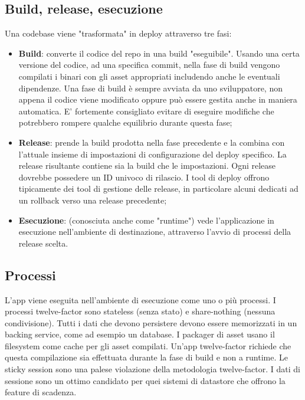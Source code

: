 \documentclass[PianoDiQualifica.tex]{subfiles}
\begin{document}
\subsection{Build, release, esecuzione}
Una codebase viene "trasformata" in deploy attraverso tre fasi:
\begin{itemize}
\item \textbf{Build}: converte il codice del repo in una build "eseguibile". Usando una certa versione del codice, ad una specifica commit, nella fase di build vengono compilati i binari con gli asset appropriati includendo anche le eventuali dipendenze. Una fase di build è sempre avviata da uno sviluppatore, non appena il codice viene modificato oppure può essere gestita anche in maniera automatica. E' fortemente consigliato evitare di eseguire modifiche che potrebbero rompere qualche equilibrio durante questa fase;
\item \textbf{Release}: prende la build prodotta nella fase precedente e la combina con l'attuale insieme di impostazioni di configurazione del deploy specifico. La release risultante contiene sia la build che le impostazioni. Ogni release dovrebbe possedere un ID univoco di rilascio. I tool di deploy offrono tipicamente dei tool di gestione delle release, in particolare alcuni dedicati ad un rollback verso una release precedente;
\item \textbf{Esecuzione}: (conosciuta anche come "runtime") vede l'applicazione in esecuzione nell'ambiente di destinazione, attraverso l'avvio di processi della release scelta.
\end{itemize}

\subsection{Processi}
L'app viene eseguita nell'ambiente di esecuzione come uno o più processi. I processi twelve-factor sono stateless (senza stato) e share-nothing (nessuna condivisione). Tutti i dati che devono persistere devono essere memorizzati in un backing service, come ad esempio un database.
I packager di asset usano il filesystem come cache per gli asset compilati. Un'app twelve-factor richiede che questa compilazione sia effettuata durante la fase di build e non a runtime.
Le sticky session sono una palese violazione della metodologia twelve-factor. I dati di sessione sono un ottimo candidato per quei sistemi di datastore che offrono la feature di scadenza.
\end{document}
